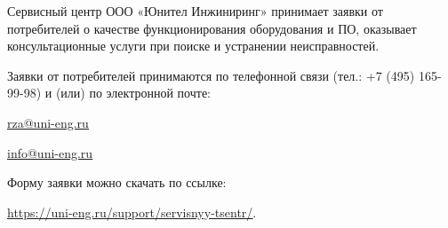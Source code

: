 \documentclass[a4paper, 12pt, table, hidelinks, DIV=calc]{extarticle}
\begin{document}
\noindent
Сервисный  центр  ООО  «Юнител  Инжиниринг»  принимает  заявки  от  потребителей  о  качестве функционирования  оборудования  и  ПО,  оказывает  консультационные  услуги  при  поиске  и  устранении неисправностей.
\par
\noindent
Заявки от потребителей принимаются  по  телефонной  связи  (тел.:  +7 (495) 165-99-98) и (или) по электронной почте:
\vskip 1mm

\href{mailto:rza@uni-eng.ru}{\color{unigreen}\uline{rza@uni-eng.ru}}
\vskip 1mm

\href{mailto:info@uni-eng.ru}{\color{unigreen}\uline{info@uni-eng.ru}}
\vskip 1mm

\noindent
Форму заявки можно скачать по ссылке: 

\href{https://uni-eng.ru/support/servisnyy-tsentr/}{\color{unigreen}\uline{https://uni-eng.ru/support/servisnyy-tsentr/}}.



\appendixtitleon
\appendixtitletocon


\makeatletter
\renewcommand{\Asbuk}[1]{\expandafter\@Asbuk\csname c@#1\endcsname}
\def\@Asbuk#1{\ifcase#1\or
 А\or Б\or В\or Г\or Д\or Е\or Ж\or И\or К\or Л\or М\or Н\or О\or П\or Р\or С\or Т\or У\or Ф\or Х\or Ц\or Ч\or Ш\or Щ\or Э\or Ю\or Я\else\@ctrerr\fi}
\makeatother
\end{document}
